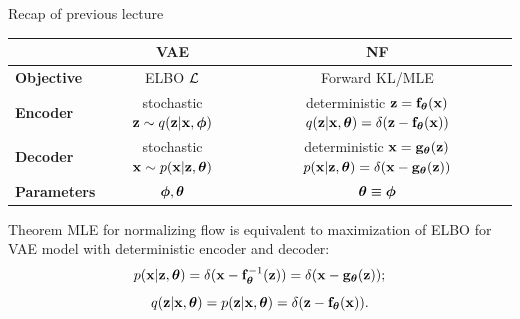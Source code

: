 \begin{frame}{Recap of previous lecture}
	\begin{table}[]
		\begin{tabular}{l|c|c}
			& \textbf{VAE} & \textbf{NF} \\ \hline
			\textbf{Objective} & ELBO $\mathcal{L}$ & Forward KL/MLE \\ \hline
			\textbf{Encoder} & \shortstack{stochastic \\ $\mathbf{z} \sim q (\mathbf{z} | \mathbf{x}, \boldsymbol{\phi})$} &  \shortstack{\\ deterministic \\ $\mathbf{z} = \mathbf{f}_{\boldsymbol{\theta}}(\mathbf{x})$ \\ $q(\mathbf{z} | \mathbf{x}, \boldsymbol{\theta}) = \delta(\mathbf{z} - \mathbf{f}_{\boldsymbol{\theta}}(\mathbf{x}))$}  \\ \hline
			\textbf{Decoder} & \shortstack{stochastic \\ $\mathbf{x} \sim p (\mathbf{x} | \mathbf{z}, \boldsymbol{\theta})$} & \shortstack{\\ deterministic \\ $\mathbf{x} = \mathbf{g}_{\boldsymbol{\theta}}(\mathbf{z})$ \\ $ p(\mathbf{x} | \mathbf{z}, \boldsymbol{\theta}) = \delta(\mathbf{x} - \mathbf{g}_{\boldsymbol{\theta}}(\mathbf{z}))$} \\ \hline
			\textbf{Parameters}  & $\boldsymbol{\phi}, \boldsymbol{\theta}$ & $\boldsymbol{\theta} \equiv \boldsymbol{\phi}$\\ 
		\end{tabular}
	\end{table}
	\begin{block}{Theorem}
		MLE for normalizing flow is equivalent to maximization of ELBO for VAE model with deterministic encoder and decoder:
		\vspace{-0.3cm}
		\[
		p(\mathbf{x} | \mathbf{z}, \boldsymbol{\theta}) = \delta (\mathbf{x} - \mathbf{f}^{-1}_{\boldsymbol{\theta}}(\mathbf{z})) = \delta (\mathbf{x} - \mathbf{g}_{\boldsymbol{\theta}}(\mathbf{z}));
		\]
		\[
		q(\mathbf{z} | \mathbf{x}, \boldsymbol{\theta}) = p(\mathbf{z} | \mathbf{x}, \boldsymbol{\theta}) = \delta (\mathbf{z} - \mathbf{f}_{\boldsymbol{\theta}}(\mathbf{x})).
		\]
	\end{block}
\end{frame}
